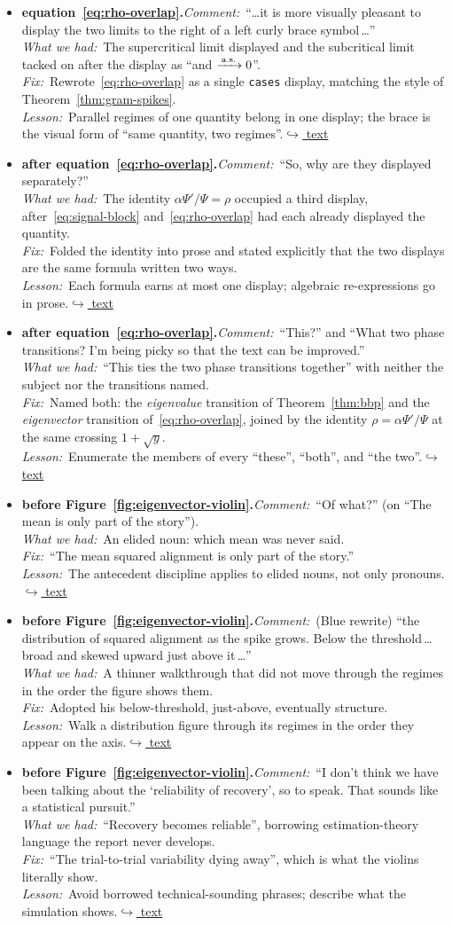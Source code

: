 \documentclass[12pt]{article}
\newcommand{\gdlogentry}[6]{%
  \item[\textcolor{thesisRev}{$\star$\,\ref{gdrev:#1}}]\hypertarget{gdlog:#1}{}%
  \textbf{#2.}\enspace\emph{Comment:}~#3\\
  \emph{What we had:}~#4\\
  \emph{Fix:}~#5\\
  \emph{Lesson:}~#6\enspace\hyperlink{gdtext:#1}{\textcolor{thesisLink}{$\hookrightarrow$ text}}}
\begin{document}
\begin{itemize}[leftmargin=2.4em,itemsep=0.55em]
\gdlogentry{r3-cases}{equation~\eqref{eq:rho-overlap}}{``\dots it is more visually pleasant to display the two limits to the right of a left curly brace symbol\,\dots''}{The supercritical limit displayed and the subcritical limit tacked on after the display as ``and \(\xrightarrow{\,\text{a.s.}\,} 0\)''.}{Rewrote~\eqref{eq:rho-overlap} as a single \texttt{cases} display, matching the style of Theorem~\ref{thm:gram-spikes}.}{Parallel regimes of one quantity belong in one display; the brace is the visual form of ``same quantity, two regimes''.}

\gdlogentry{r3-two-displays}{after equation~\eqref{eq:rho-overlap}}{``So, why are they displayed separately?''}{The identity \(\alpha \Psi'/\Psi = \rho\) occupied a third display, after~\eqref{eq:signal-block} and~\eqref{eq:rho-overlap} had each already displayed the quantity.}{Folded the identity into prose and stated explicitly that the two displays are the same formula written two ways.}{Each formula earns at most one display; algebraic re-expressions go in prose.}

\gdlogentry{r3-transitions}{after equation~\eqref{eq:rho-overlap}}{``This?'' and ``What two phase transitions? I'm being picky so that the text can be improved.''}{``This ties the two phase transitions together'' with neither the subject nor the transitions named.}{Named both: the \emph{eigenvalue} transition of Theorem~\ref{thm:bbp} and the \emph{eigenvector} transition of~\eqref{eq:rho-overlap}, joined by the identity \(\rho = \alpha\Psi'/\Psi\) at the same crossing \(1 + \sqrt{y}\).}{Enumerate the members of every ``these'', ``both'', and ``the two''.}

\gdlogentry{r3-mean-ofwhat}{before Figure~\ref{fig:eigenvector-violin}}{``Of what?'' (on ``The mean is only part of the story'').}{An elided noun: which mean was never said.}{``The mean squared alignment is only part of the story.''}{The antecedent discipline applies to elided nouns, not only pronouns.}

\gdlogentry{r3-violin-rewrite}{before Figure~\ref{fig:eigenvector-violin}}{(Blue rewrite) ``the distribution of squared alignment as the spike grows. Below the threshold\,\dots broad and skewed upward just above it\,\dots''}{A thinner walkthrough that did not move through the regimes in the order the figure shows them.}{Adopted his below-threshold, just-above, eventually structure.}{Walk a distribution figure through its regimes in the order they appear on the axis.}

\gdlogentry{r3-reliability}{before Figure~\ref{fig:eigenvector-violin}}{``I don't think we have been talking about the `reliability of recovery', so to speak. That sounds like a statistical pursuit.''}{``Recovery becomes reliable'', borrowing estimation-theory language the report never develops.}{``The trial-to-trial variability dying away'', which is what the violins literally show.}{Avoid borrowed technical-sounding phrases; describe what the simulation shows.}


\end{itemize}
\end{document}
